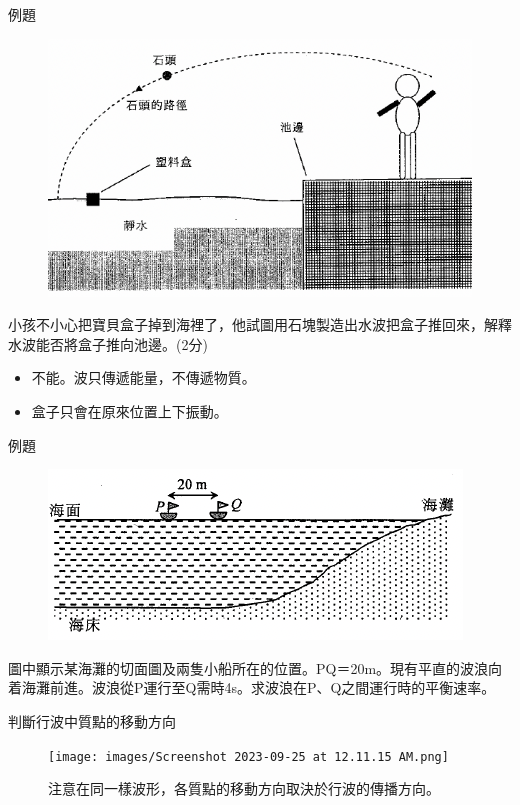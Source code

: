 \documentclass[13pt]{beamer}
\begin{document}
\begin{frame}[t]{例題}
    \begin{figure}
        \centering
        \includegraphics[width=0.5\linewidth]{images/Screenshot 2023-09-25 at 3.02.30 AM.png}


    \end{figure}
    小孩不小心把寶貝盒子掉到海裡了，他試圖用石塊製造出水波把盒子推回來，解釋水波能否將盒子推向池邊。(2分)
    \bigskip
    \begin{itemize}
        \item 不能。波只傳遞能量，不傳遞物質。
        \item 盒子只會在原來位置上下振動。
    \end{itemize}
\end{frame}

\begin{frame}[t]{例題}
    \begin{figure}
        \centering
        \includegraphics[width=0.6\linewidth]{images/Screenshot 2023-09-25 at 2.56.42 AM.png}


    \end{figure}
    圖中顯示某海灘的切面圖及兩隻小船所在的位置。PQ＝20m。現有平直的波浪向着海灘前進。波浪從P運行至Q需時4s。求波浪在P、Q之間運行時的平衡速率。
\end{frame}



\begin{frame}{判斷行波中質點的移動方向}

    \begin{figure}
        \centering
        \texttt{[image: images/Screenshot 2023-09-25 at 12.11.15 AM.png]}
        \caption{注意在同一樣波形，各質點的移動方向取決於行波的傳播方向。}

    \end{figure}
\end{frame}
\end{document}

